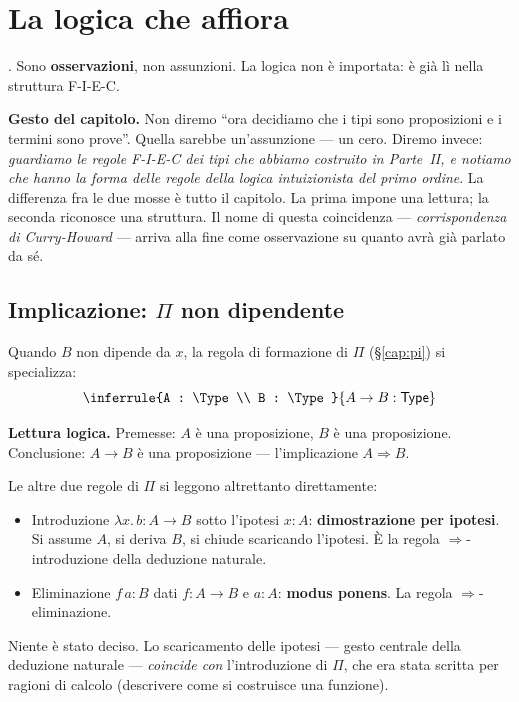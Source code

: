 \chapter{La logica che affiora}\label{cap:logica}

. Sono \textbf{osservazioni}, non assunzioni. La logica non \`e importata: \`e gi\`a l\`i nella struttura F-I-E-C.

\bigskip

\noindent\textbf{Gesto del capitolo.} Non diremo ``ora decidiamo che i tipi sono proposizioni e i termini sono prove''. Quella sarebbe un'assunzione --- un cero. Diremo invece: \emph{guardiamo le regole F-I-E-C dei tipi che abbiamo costruito in Parte~II, e notiamo che hanno la forma delle regole della logica intuizionista del primo ordine}. La differenza fra le due mosse \`e tutto il capitolo. La prima impone una lettura; la seconda riconosce una struttura. Il nome di questa coincidenza --- \emph{corrispondenza di Curry-Howard} --- arriva alla fine come osservazione su quanto avr\`a gi\`a parlato da s\'e.

\section*{Implicazione: $\Pi$ non dipendente}

Quando $B$ non dipende da $x$, la regola di formazione di $\Pi$ (\S\ref{cap:pi}) si specializza:
\[
\inferrule{A : \Type \\ B : \Type}{A \to B : \Type}
\]

\noindent\textbf{Lettura logica.} Premesse: $A$ \`e una proposizione, $B$ \`e una proposizione. Conclusione: $A \to B$ \`e una proposizione --- l'implicazione $A \Rightarrow B$.

Le altre due regole di $\Pi$ si leggono altrettanto direttamente:
\begin{itemize}
\item Introduzione $\lambda x.\,b : A \to B$ sotto l'ipotesi $x : A$: \textbf{dimostrazione per ipotesi}. Si assume $A$, si deriva $B$, si chiude scaricando l'ipotesi. \`E la regola $\Rightarrow$-introduzione della deduzione naturale.
\item Eliminazione $f\,a : B$ dati $f : A \to B$ e $a : A$: \textbf{modus ponens}. La regola $\Rightarrow$-eliminazione.
\end{itemize}

\noindent Niente \`e stato deciso. Lo scaricamento delle ipotesi --- gesto centrale della deduzione naturale --- \emph{coincide con} l'introduzione di $\Pi$, che era stata scritta per ragioni di calcolo (descrivere come si costruisce una funzione).


